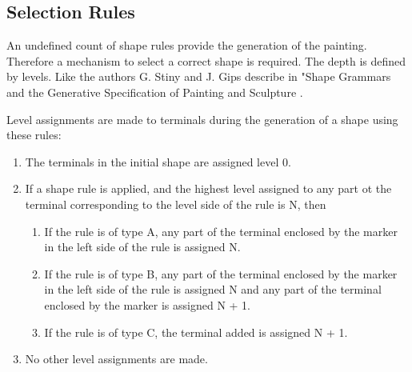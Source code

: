 \documentclass[11pt, a4paper]{report}
\begin{document}
\pagebreak
\subsection{Selection Rules}
An undefined count of shape rules provide the generation of the painting. Therefore a mechanism to select a correct shape is required. The depth is defined by levels. Like the authors G. Stiny and J. Gips describe in "Shape Grammars and the Generative Specification of Painting and Sculpture  \citep{shapeGrammars:1972}.
\begin{displayquote}
    Level assignments are made to terminals during the generation of a shape using these rules:
    \begin{enumerate}
        \item The terminals in the initial shape are assigned level 0.
        \item If a shape rule is applied, and the highest level assigned to any part ot the terminal corresponding to the level side of the rule is N, then
        \begin{enumerate}
            \item If the rule is of type A, any part of the terminal enclosed by the marker in the left side of the rule is assigned N.
            \item If the rule is of type B, any part of the terminal enclosed by the marker in the left side of the rule is assigned N and any part of the terminal enclosed by the marker is assigned N + 1.
            \item If the rule is of type C, the terminal added is assigned N + 1.
        \end{enumerate}
        \item No other level assignments are made.
    \end{enumerate}
\end{displayquote}
\end{document}
